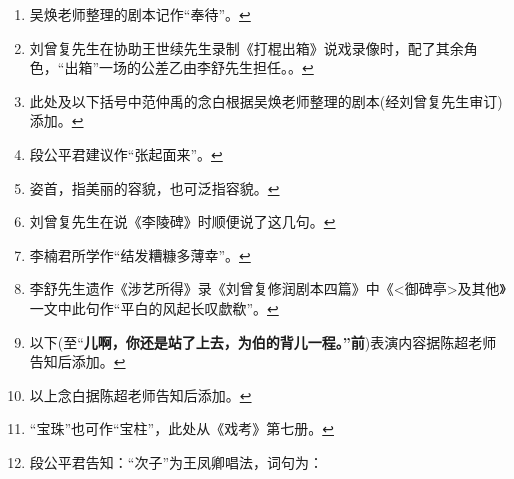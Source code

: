 \begin{enumerate}
\item
  \leavevmode\hypertarget{fn491}{}%
  吴焕老师整理的剧本记作``奉待''。\protect\hyperlink{fnref491}{↩}
\item
  \leavevmode\hypertarget{fn492}{}%
  刘曾复先生在协助王世续先生录制《打棍出箱》说戏录像时，配了其余角色，``出箱''一场的公差乙由李舒先生担任。。\protect\hyperlink{fnref492}{↩}
\item
  \leavevmode\hypertarget{fn493}{}%
  此处及以下括号中范仲禹的念白根据吴焕老师整理的剧本(经刘曾复先生审订)添加。\protect\hyperlink{fnref493}{↩}
\item
  \leavevmode\hypertarget{fn494}{}%
  段公平君建议作``张起面来''。\protect\hyperlink{fnref494}{↩}
\item
  \leavevmode\hypertarget{fn495}{}%
  姿首，指美丽的容貌，也可泛指容貌。\protect\hyperlink{fnref495}{↩}
\item
  \leavevmode\hypertarget{fn496}{}%
  刘曾复先生在说《李陵碑》时顺便说了这几句。\protect\hyperlink{fnref496}{↩}
\item
  \leavevmode\hypertarget{fn497}{}%
  李楠君所学作``结发糟糠多薄幸''。\protect\hyperlink{fnref497}{↩}
\item
  \leavevmode\hypertarget{fn498}{}%
  李舒先生遗作《涉艺所得》录《刘曾复修润剧本四篇》中《\textless{}御碑亭\textgreater{}及其他》一文中此句作``平白的风起长叹歔欷''。\protect\hyperlink{fnref498}{↩}
\item
  \leavevmode\hypertarget{fn499}{}%
  以下(至``\textbf{儿啊，你还是站了上去，为伯的背儿一程。''前})表演内容据陈超老师告知后添加。\protect\hyperlink{fnref499}{↩}
\item
  \leavevmode\hypertarget{fn500}{}%
  以上念白据陈超老师告知后添加。\protect\hyperlink{fnref500}{↩}
\item
  \leavevmode\hypertarget{fn501}{}%
  ``宝珠''也可作``宝柱''，此处从《戏考》第七册。\protect\hyperlink{fnref501}{↩}
\item
  \leavevmode\hypertarget{fn502}{}%
  段公平君告知：``次子''为王凤卿唱法，词句为：


\end{enumerate}
